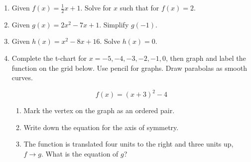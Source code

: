 \documentclass[12pt, twoside]{article}
\begin{document}
\begin{enumerate}
\vspace{4cm}

  \item Given $f(x)=\frac{1}{2} x+1$. Solve for $x$ such that for $f(x)=2$. \vspace{4cm}
  \item Given $g(x)=2x^2-7x+1$. Simplify $g(-1)$. \vspace{3cm}
  \item Given $h(x)=x^2-8x+16$. Solve $h(x)=0$. \vspace{3cm}

\newpage

  \item Complete the t-chart for $x=-5, -4, -3, -2, -1, 0$, then graph and label the function on the grid below. Use pencil for graphs. Draw parabolas as smooth curves.

      \[f(x) = (x+3)^2-4\]


    \begin{center} %
    \end{center}

  \begin{enumerate}
    \item Mark the vertex on the graph as an ordered pair.
    \item Write down the equation for the axis of symmetry. \vspace{1.5cm}
    \item The function is translated four units to the right and three units up, $f \rightarrow g$. What is the equation of $g$?
  \end{enumerate}

  \newpage


\end{enumerate}
\end{document}
